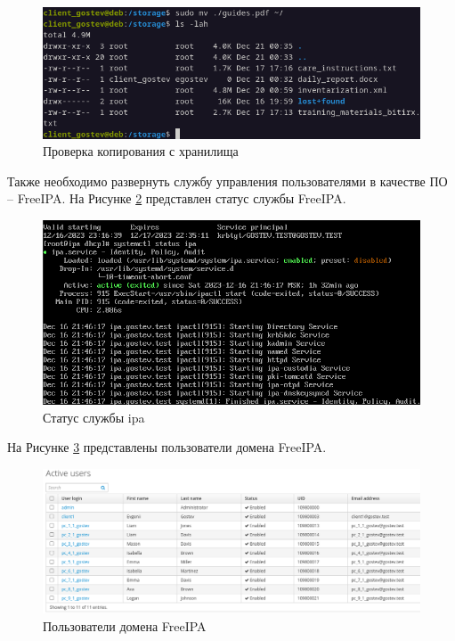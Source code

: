 \documentclass[14pt, a4paper]{extarticle}
\numberwithin{equation}{section}
\begin{document}
\begin{figure}[H]
        \centering
        \includegraphics[scale=1.4]{services/iscsi/read.png}
        \caption{Проверка копирования с хранилища}
        \label{fig:iscsi_read}
\end{figure}


Также необходимо развернуть службу управления пользователями в качестве ПО -- FreeIPA.
На Рисунке \ref{fig:ipa_status} представлен статус службы FreeIPA.
\begin{figure}[H]
        \centering
        \includegraphics[scale=1]{services/freeipa/ipa_status.png}
        \caption{Статус службы ipa}
        \label{fig:ipa_status}
\end{figure}

На Рисунке \ref{fig:ipa_users} представлены пользователи домена FreeIPA.
\begin{figure}[H]
        \centering
        \includegraphics[scale=0.65]{services/freeipa/users.png}
        \caption{Пользователи домена FreeIPA}
        \label{fig:ipa_users}
\end{figure}
\end{document}
